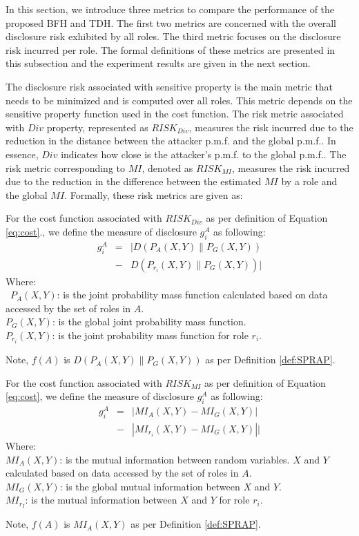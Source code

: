 In this section, we introduce three metrics to compare the performance of the proposed BFH and TDH. The first two metrics are concerned with the overall disclosure risk exhibited by all roles. The third metric focuses on the disclosure risk incurred per role. The formal definitions of these metrics are presented in this subsection and the experiment results are given in the next section. 

The  disclosure risk associated with sensitive property is the main metric that needs to be minimized and is computed over all roles. This metric depends on the  sensitive property function used in the cost function. The risk  metric associated  with $Div$ property, represented  as $RISK_{Div}$, measures the risk incurred due to the reduction in the distance between the attacker p.m.f. and the global p.m.f.. In essence, $Div$ indicates how close is the attacker's p.m.f. to the global p.m.f.. The risk metric corresponding to $MI$, denoted as $RISK_{MI}$, measures the risk incurred due to the reduction in the difference between the estimated $MI$ by a role and the global $MI$. Formally, these risk metrics are given as:\\
\begin{definition}
For the cost function associated with  $RISK_{Div}$ as per definition of Equation \ref{eq:cost}., we define the measure of disclosure  $g_i^A$ as following: \\
\begin{eqnarray*}
g_i^A &= &|D(P_A(X,Y) \parallel P_G(X,Y))\\
& -&D(P_{r_i}(X,Y) \parallel P_G(X,Y)) |
\end{eqnarray*}
Where:\\\
$P_A(X,Y)$: is the joint probability mass function  calculated based on data accessed by  the set of roles in $A$.\\
$P_G(X,Y)$: is the global  joint probability mass function.\\
$P_{r_i}(X,Y)$: is the joint probability mass function  for role $r_i$.
\end{definition}
Note, $f(A)$ is $D(P_A(X,Y) \parallel P_G(X,Y)) $ as per Definition \ref{def:SPRAP}. 

\begin{definition}
For the cost function associated with $RISK_{MI}$ as per definition of Equation \ref{eq:cost}, we define the measure of disclosure  $g_i^A$ as following: \\
\begin{eqnarray*}
g_i^A &= &| MI_A(X,Y) -MI_G(X,Y)|\\
&   - & | MI_{r_i}(X,Y) -MI_G(X,Y)|  |
\end{eqnarray*}
Where:\\
$MI_A(X,Y)$: is the mutual information between random variables. $X$ and  $Y$ calculated based on data accessed by the  set of roles in $A$.\\
$MI_G(X,Y)$: is the global mutual information between  $X$ and  $Y$.\\
$MI_{r_I}$: is the mutual information between  $X$ and $Y$ for role $r_i$.
\end{definition}
Note, $f(A)$ is $MI_A(X,Y) $ as per Definition \ref{def:SPRAP}. 

